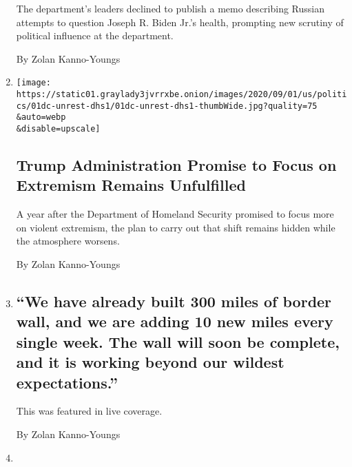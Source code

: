 \begin{enumerate}
  The department's leaders declined to publish a memo describing Russian
  attempts to question Joseph R. Biden Jr.'s health, prompting new
  scrutiny of political influence at the department.

  By Zolan Kanno-Youngs
\item
  \href{/2020/09/01/us/politics/trump-homeland-security-extremism.html}{}

  \texttt{[image: https://static01.graylady3jvrrxbe.onion/images/2020/09/01/us/politics/01dc-unrest-dhs1/01dc-unrest-dhs1-thumbWide.jpg?quality=75\\\&auto=webp\\\&disable=upscale]}

  \hypertarget{trump-administration-promise-to-focus-on-extremism-remains-unfulfilled}{%
  \subsection{Trump Administration Promise to Focus on Extremism Remains
  Unfulfilled}\label{trump-administration-promise-to-focus-on-extremism-remains-unfulfilled}}

  A year after the Department of Homeland Security promised to focus
  more on violent extremism, the plan to carry out that shift remains
  hidden while the atmosphere worsens.

  By Zolan Kanno-Youngs
\item
  \href{/live/2020/08/27/us/rnc-fact-check/we-have-already-built-300-miles-of-border-wall-and-we-are-adding-10-new-miles-every-single-week-the-wall-will-soon-be-complete-a}{}

  \hypertarget{we-have-already-built-300-miles-of-border-wall-and-we-are-adding-10-new-miles-every-single-week-the-wall-will-soon-be-complete-and-it-is-working-beyond-our-wildest-expectations}{%
  \subsection{``We have already built 300 miles of border wall, and we
  are adding 10 new miles every single week. The wall will soon be
  complete, and it is working beyond our wildest
  expectations.''}\label{we-have-already-built-300-miles-of-border-wall-and-we-are-adding-10-new-miles-every-single-week-the-wall-will-soon-be-complete-and-it-is-working-beyond-our-wildest-expectations}}

  This was featured in live coverage.

  By Zolan Kanno-Youngs
\item
  \href{/2020/08/27/us/elections/some-of-the-immigrants-trump-naturalized-on-tuesday-didnt-know-they-were-being-broadcast.html}{}


\end{enumerate}
